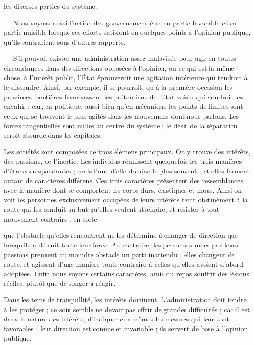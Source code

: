 \documentclass[11pt,a4paper]{article}
\begin{document}
les diverses parties du système. ---

--- Nous voyons aussi l'action des gouvernemens être en partie favorable et
en partie nuisible lorsque ses  efforts 
satisfont en quelques points à l'opinion publique, qu'ils contrarient sous
d'autres rapports. ---

--- S'il pouvoit exister une administration assez malavisée pour agir en
toutes circonstances dans des directions opposées à l'opinion, ou ce qui est
la même chose, à l'intérêt public, l'État 
éprouveroit une agitation intérieure qui tendroit à le dissoudre. Ainsi, par
exemple, il se pourroit, qu'à la première occasion les provinces frontières
favorisassent les prétentions de l'état voisin qui voudroit les envahir ;
car, en politique, aussi bien qu'en mécanique les points de limites sont
ceux qui se trouvent le plus agités dans les mouvemens dont nous parlons. Les
forces tangentielles sont nulles au centre du système ; le désir de la
séparation  seroit absurde dans les capitales.

Les sociétés sont composées de trois élémens principaux. On y trouve des
intérêts, des passions, de l'inertie. Les individus 
réunissent quelquefois les trois manières d'être correspondantes ; mais l'une
d'elle domine le plus souvent ; et elles forment autant de caractères différens. Ces trois caractères
présentent des ressemblances avec la manière dont se comportent les corps
durs, élastiques et mous. Ainsi on voit les personnes exclusivement occupées
de leurs intérêts tenir obstinément à la route qui les conduit au but
qu'elles veulent atteindre, et résister à tout mouvement contraire ; en sorte

que  l'obstacle qu'elles rencontrent ne les détermine à changer
de direction que lorsqu'ils  a détruit toute leur force. Au
contraire, les personnes mues par leurs passions prennent au moindre obstacle
un parti inattendu ; elles changent de route, et agissent d'une manière toute
contraire à celles qu'elles avoient d'abord adoptées. Enfin nous voyons
certains caractères, amis du repos souffrir des lésions réelles, plutôt que
de songer à réagir.

Dans les tems de tranquillité, les intérêts dominent. L'administration doit
tendre à les protéger ; ce soin semble ne devoir pas offrir de grandes
difficultés ; car il est dans la nature des intérêts, d'indiquer eux-mêmes
les mesures qui leur sont favorables ; leur direction est connue et
invariable ; ils servent de base à l'opinion publique.
\end{document}
